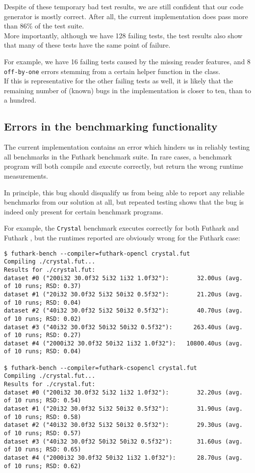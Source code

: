 Despite of these temporary bad test results, we are still confident that our
code generator is mostly correct. After all, the current implementation does
pass more than 86\% of the test suite.
\\
More importantly, although we have 128 failing tests, the test results also show
that many of these tests have the same point of failure.

For example, we have 16 failing tests caused by the missing reader features, and 8
\texttt{off-by-one} errors stemming from a certain helper function in the
\csharp{} class.
\\
If this is representative for the other failing tests as well, it is likely that
the remaining number of (known) bugs in the implementation is closer to ten, than
to a hundred.

\subsection{Errors in the benchmarking functionality}
\label{sec:errorsinbenchmark}
The current implementation contains an error which hinders us in reliably
testing all benchmarks in the Futhark benchmark suite. In rare cases, a
benchmark program will both compile and execute correctly, but
return the wrong runtime measurements.

In principle, this bug should disqualify us from being able to report any
reliable benchmarks from our solution at all, but repeated testing shows that
the bug is indeed only present for certain benchmark programs.

For example, the \texttt{Crystal} benchmark executes correctly for both Futhark
\clang{} and Futhark \csharp{}, but the runtimes reported are obviously
wrong for the Futhark \csharp{} case:

\begin{verbatim}
$ futhark-bench --compiler=futhark-opencl crystal.fut
Compiling ./crystal.fut...
Results for ./crystal.fut:
dataset #0 ("200i32 30.0f32 5i32 1i32 1.0f32"):        32.00us (avg. of 10 runs; RSD: 0.37)
dataset #1 ("20i32 30.0f32 5i32 50i32 0.5f32"):        21.20us (avg. of 10 runs; RSD: 0.04)
dataset #2 ("40i32 30.0f32 5i32 50i32 0.5f32"):        40.70us (avg. of 10 runs; RSD: 0.02)
dataset #3 ("40i32 30.0f32 50i32 50i32 0.5f32"):      263.40us (avg. of 10 runs; RSD: 0.27)
dataset #4 ("2000i32 30.0f32 50i32 1i32 1.0f32"):   10800.40us (avg. of 10 runs; RSD: 0.04)

$ futhark-bench --compiler=futhark-csopencl crystal.fut
Compiling ./crystal.fut...
Results for ./crystal.fut:
dataset #0 ("200i32 30.0f32 5i32 1i32 1.0f32"):        32.20us (avg. of 10 runs; RSD: 0.54)
dataset #1 ("20i32 30.0f32 5i32 50i32 0.5f32"):        31.90us (avg. of 10 runs; RSD: 0.58)
dataset #2 ("40i32 30.0f32 5i32 50i32 0.5f32"):        29.30us (avg. of 10 runs; RSD: 0.57)
dataset #3 ("40i32 30.0f32 50i32 50i32 0.5f32"):       31.60us (avg. of 10 runs; RSD: 0.65)
dataset #4 ("2000i32 30.0f32 50i32 1i32 1.0f32"):      28.70us (avg. of 10 runs; RSD: 0.62)
\end{verbatim}

